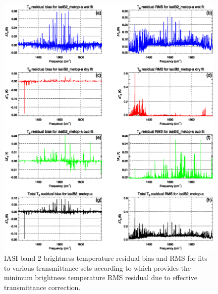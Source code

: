 \begin{figure}[htp]
  \centering
  \includegraphics[scale=0.8]{graphics/stats/new/iasiB2_metop-a.FitStats.eps}
  \caption{IASI band 2 brightness temperature residual bias and RMS for fits to various transmittance sets according to which provides the minimum brightness temperature RMS residual due to effective transmittance correction.}
  \label{fig:new_iasiB2_stats}
\end{figure}


